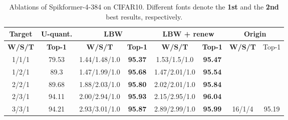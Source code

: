 \begin{table}[b]
\centering
\caption{Ablations of Spikformer-4-384 on CIFAR10. Different fonts denote the \textbf{1st} and the 
{\color[HTML]{9B9B9B} \textbf{2nd}} best results, respectively.}
\label{exp:ablation of spf}
\begin{adjustbox}{max width=0.46\textwidth}
\begin{threeparttable}
\begin{tabular}{c|c|cc|cc|cc}
\toprule
{ \textbf{ Target }}                                                                                   & {  \textbf{U-quant.}} & \multicolumn{2}{c|}{{  \textbf{LBW}}}                & \multicolumn{2}{c|}{{  \textbf{LBW + renew}}}                 & \multicolumn{2}{c}{\textbf{Origin \cite{zhou2022spikformer}}}          \\ \midrule
{  \textbf{W/S/T}} & {  \textbf{Top-1}}    & {  \textbf{W/S/T}} & {  \textbf{Top-1}} & {  \textbf{W/S/T}} & {  \textbf{Top-1}} & \textbf{W/S/T}           & Top-1                   \\ \midrule
{  1/1/1}                                                                              & {  79.53}             & {  1.44/1.48/1.0}  & {\color[HTML]{9B9B9B} \textbf{95.37}} & {  1.53/1.5/1.0}   & {  \textbf{95.47}} &                          &                         \\
{  1/2/1}                                                                              & {  89.3}              & {  1.47/1.99/1.0}  & {  \textbf{95.68}} & {  1.47/2.01/1.0}  & {\color[HTML]{9B9B9B} \textbf{95.54}} &                          &                         \\
{  2/2/1}                                                                              & {  89.68}             & {  1.88/2.03/1.0}  & {\color[HTML]{9B9B9B} \textbf{95.80}} & {  2.02/2.01/1.0}  & {  \textbf{95.84}} &                          &                         \\
{  2/3/1}                                                                              & {  94.11}             & {  2.00/2.94/1.0}  & {\color[HTML]{9B9B9B} \textbf{95.93}} & {  2.15/2.95/1.0}  & {  \textbf{96.04}} &                          &                         \\
{  3/3/1}                                                                              & {  94.21}             & {  2.93/3.01/1.0}  & {\color[HTML]{9B9B9B} \textbf{95.87}} & {  2.89/2.99/1.0}  & {  \textbf{95.99}} & \multirow{-5}{*}{16/1/4} & \multirow{-5}{*}{95.19} \\ \bottomrule
\end{tabular}

\end{threeparttable}
\end{adjustbox}
\end{table}
